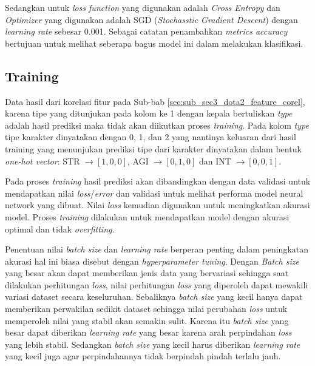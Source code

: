 Sedangkan untuk \textit{loss function} yang digunakan adalah \textit{Cross Entropy} dan \textit{Optimizer} yang digunakan adalah SGD (\textit{Stochasstic Gradient Descent}) dengan \textit{learning rate} sebesar 0.001. Sebagai catatan penambahkan \textit{metrics accuracy} bertujuan untuk melihat seberapa bagus model ini dalam melakukan klasifikasi.
\vspace{1ex}

\subsection{Training}
\label{sec:sub_sec3_dota2_train}
\vspace{1ex}

Data hasil dari korelasi fitur pada Sub-bab \ref{sec:sub_sec3_dota2_feature_corel}, karena tipe yang ditunjukan pada kolom ke 1 dengan kepala bertuliskan \textit{type} adalah hasil prediksi maka tidak akan diikutkan proses \textit{training}. Pada kolom \textit{type} tipe karakter dinyatakan dengan 0, 1, dan 2 yang nantinya keluaran dari hasil training yang menunjukan prediksi tipe dari karakter dinyatakan dalam bentuk \textit{one-hot vector}: STR $\rightarrow [1, 0, 0]$, AGI $\rightarrow [0, 1, 0]$ dan INT $\rightarrow [0, 0, 1]$. 
\vspace{1ex}

Pada proses \textit{training} hasil prediksi akan dibandingkan dengan data validasi untuk mendapatkan nilai \textit{loss}/\textit{error} dan validasi untuk melihat performa model neural network yang dibuat. Nilai \textit{loss} kemudian digunakan untuk meningkatkan akurasi model. Proses \textit{training} dilakukan untuk mendapatkan model dengan akurasi optimal dan tidak \textit{overfitting}.
\vspace{1ex}

Penentuan nilai \textit{batch size} dan \textit{learning rate} berperan penting dalam peningkatan akurasi hal ini biasa disebut dengan \textit{hyperparameter tuning}. Dengan \textit{Batch size} yang besar akan dapat memberikan jenis data yang bervariasi sehingga saat dilakukan perhitungan \textit{loss}, nilai perhitungan \textit{loss} yang diperoleh dapat mewakili variasi dataset secara keseluruhan. Sebaliknya \textit{batch size} yang kecil hanya dapat memberikan perwakilan sedikit dataset sehingga nilai perubahan \textit{loss} untuk memperoleh nilai yang stabil akan semakin sulit. Karena itu \textit{batch size} yang besar dapat diberikan \textit{learning rate} yang besar karena arah perpindahan \textit{loss} yang lebih stabil. Sedangkan \textit{batch size} yang kecil harus diberikan \textit{learning rate} yang kecil juga agar perpindahannya tidak berpindah pindah terlalu jauh.
\vspace{1ex}

